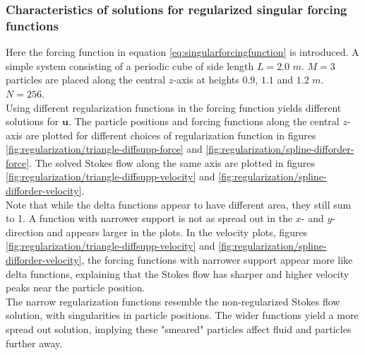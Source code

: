 \documentclass[a4paper,
twoside=false,abstract=false,numbers=noenddot,
titlepage=false,headings=small,parskip=half,version=last]{scrartcl}
\begin{document}
\subsubsection{Characteristics of solutions for regularized singular forcing functions}
Here the forcing function in equation \eqref{eq:singularforcingfunction} is introduced.
A simple system consisting of a periodic cube of side length $L=2.0$ $m$. $M=3$ particles are placed along the central $z$-axis at heights $0.9$, $1.1$ and $1.2$ $m$. $N=256$.\\
Using different regularization functions in the forcing function yields different solutions for $\mathbf{u}$.
The particle positions and forcing functions along the central $z$-axis are plotted for different choices of regularization function in figures \ref{fig:regularization/triangle-diffsupp-force} and \ref{fig:regularization/spline-difforder-force}.
The solved Stokes flow along the same axis are plotted in figures \ref{fig:regularization/triangle-diffsupp-velocity} and \ref{fig:regularization/spline-difforder-velocity}.\\
Note that while the delta functions appear to have different area, they still sum to 1.
A function with narrower support is not as spread out in the $x$- and $y$-direction and appears larger in the plots.
In the velocity plots, figures \ref{fig:regularization/triangle-diffsupp-velocity} and \ref{fig:regularization/spline-difforder-velocity}, the forcing functions with narrower support appear more like delta functions, explaining that the Stokes flow has sharper and higher velocity peaks near the particle position.\\
The narrow regularization functions resemble the non-regularized Stokes flow solution, with singularities in particle positions.
The wider functions yield a more spread out solution, implying these "smeared" particles affect fluid and particles further away.
\end{document}

